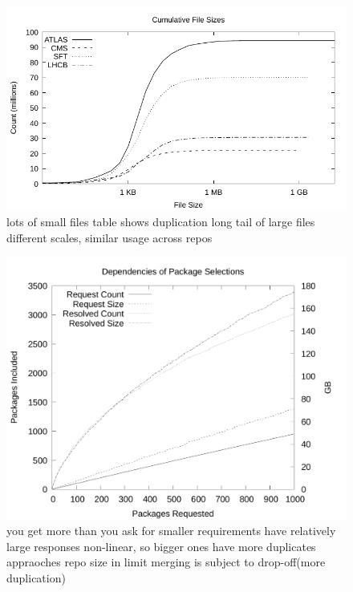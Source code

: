 \documentclass[sigconf]{acmart}
\begin{document}
\begin{figure}
\includegraphics[width=\linewidth]{curated/cdf/cdf.pdf}
\label{fig:cdf}
lots of small files
table shows duplication
long tail of large files
different scales, similar usage across repos

\fi
\end{figure}

\begin{figure}
\includegraphics[width=\linewidth]{curated/closure/closure.pdf}
\label{fig:picks}
you get more than you ask for
smaller requirements have relatively large responses
non-linear, so bigger ones have more duplicates
appraoches repo size in limit
merging is subject to drop-off(more duplication)
\fi
\end{figure}
\end{document}
